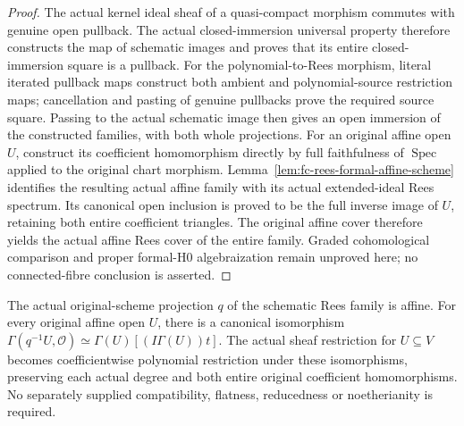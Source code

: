 \begin{proof}
The actual kernel ideal sheaf of a quasi-compact morphism commutes with genuine open
pullback. The actual closed-immersion universal property therefore constructs the map
of schematic images and proves that its entire closed-immersion square is a pullback.
For the polynomial-to-Rees morphism, literal iterated pullback maps construct both
ambient and polynomial-source restriction maps; cancellation and pasting of genuine
pullbacks prove the required source square. Passing to the actual schematic image
then gives an open immersion of the constructed families, with both whole projections.
For an original affine open $U$, construct its coefficient homomorphism directly by
full faithfulness of $\operatorname{Spec}$ applied to the original chart morphism.
Lemma~\ref{lem:fc-rees-formal-affine-scheme} identifies the resulting actual affine
family with its actual extended-ideal Rees spectrum. Its canonical open inclusion is
proved to be the full inverse image of $U$, retaining both entire coefficient triangles.
The original affine cover therefore yields the actual affine Rees cover of the entire
family. Graded cohomological comparison and proper formal-H0 algebraization remain
unproved here; no connected-fibre conclusion is asserted.
\end{proof}

\begin{lemma}\label{lem:fc-rees-formal-chart-sheaf}
\leanok
{}
The actual original-scheme projection $q$ of the schematic Rees family is affine.
For every original affine open $U$, there is a canonical isomorphism
$\Gamma(q^{-1}U,\mathcal O)\simeq\Gamma(U)[(I\Gamma(U))t]$.
The actual sheaf restriction for $U\subseteq V$ becomes coefficientwise polynomial
restriction under these isomorphisms, preserving each actual degree and both entire
original coefficient homomorphisms. No separately supplied compatibility, flatness,
reducedness or noetherianity is required.
\end{lemma}

